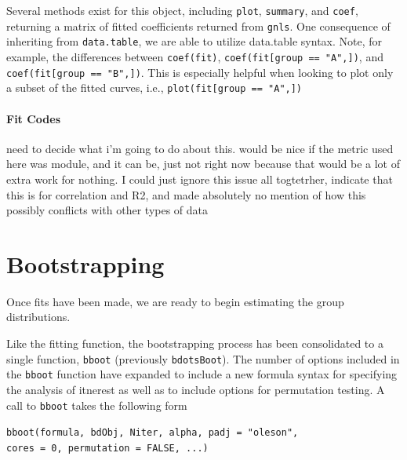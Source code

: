 \documentclass{article}
\newcommand{\xt}{\texttt}%
\begin{document}
Several methods exist for this object, including \texttt{plot}, \texttt{summary}, and \texttt{coef}, returning a matrix of fitted coefficients returned from \texttt{gnls}. One consequence of inheriting from \texttt{data.table}, we are able to utilize data.table syntax. Note, for example, the differences between \texttt{coef(fit)}, \texttt{coef(fit[group == "A",])}, and \texttt{coef(fit[group == "B",])}. This is especially helpful when looking to plot only a subset of the fitted curves, i.e., \xt{plot(fit[group == "A",])}


\paragraph{Fit Codes}

need to decide what i'm going to do about this. would be nice if the metric used here was module, and it can be, just not right now because that would be a lot of extra work for nothing. I could just ignore this issue all togtetrher, indicate that this is for correlation and R2, and made absolutely no mention of how this possibly conflicts with other types of data

\section{Bootstrapping}

Once fits have been made, we are ready to begin estimating the group distributions.

Like the fitting function, the bootstrapping process has been consolidated to a single function, \texttt{bboot} (previously \texttt{bdotsBoot}). The number of options included in the \xt{bboot} function have expanded to include a new formula syntax for specifying the analysis of itnerest as well as to include options for permutation testing. A call to \xt{bboot} takes the following form

\begin{center}
\tt bboot(formula, bdObj, Niter, alpha,   padj = "oleson", \\ cores = 0, permutation = FALSE, ...)
\end{center}
\end{document}
